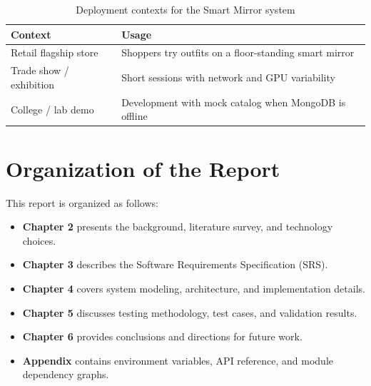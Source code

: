\begin{table}[H]
  \centering
  \caption{Deployment contexts for the Smart Mirror system}
  \label{tab:deployment-context}
  \begin{tabular}{@{}lp{10cm}@{}}
    \toprule
    \textbf{Context} & \textbf{Usage} \\
    \midrule
    Retail flagship store & Shoppers try outfits on a floor-standing smart mirror \\
    Trade show / exhibition & Short sessions with network and GPU variability \\
    College / lab demo & Development with mock catalog when MongoDB is offline \\
    \bottomrule
  \end{tabular}
\end{table}

\section{Organization of the Report}
\label{sec:organization}

This report is organized as follows:

\begin{itemize}[leftmargin=*]
  \item \textbf{Chapter 2} presents the background, literature survey, and technology choices.
  \item \textbf{Chapter 3} describes the Software Requirements Specification (SRS).
  \item \textbf{Chapter 4} covers system modeling, architecture, and implementation details.
  \item \textbf{Chapter 5} discusses testing methodology, test cases, and validation results.
  \item \textbf{Chapter 6} provides conclusions and directions for future work.
  \item \textbf{Appendix} contains environment variables, API reference, and module dependency graphs.
\end{itemize}
